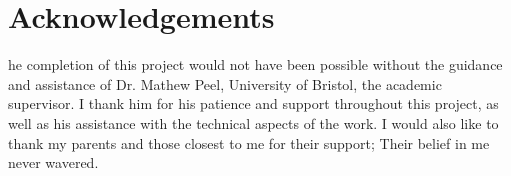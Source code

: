 %
%

\chapter*{Acknowledgements}
\begin{SingleSpace}
he completion of this project would not have been possible without the guidance and assistance of Dr. Mathew Peel, University of Bristol, the academic supervisor. I thank him for his patience and support throughout this project, as well as his assistance with the technical aspects of the work. I would also like to thank my parents and those closest to me for their support; Their belief in me never wavered. 
\end{SingleSpace}
\clearpage